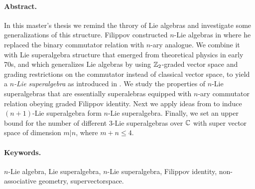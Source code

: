 \paragraph{Abstract.}
    In this master’s thesis we remind the throry of Lie algebras and
    investigate some generalizations of this structure. Filippov constructed
    $n$-Lie algebras in \cite{filippov1985} where he replaced the binary
    commutator relation with $n$-ary analogue. We combine it with
    Lie superalgebra structure that emerged from theoretical
    physics in early 70s, and which generalizes Lie algebras by using
    $\mathbb{Z}_2$-graded vector space and grading restrictions on the commutator
    instead of classical vector space, to yield a \emph{$n$-Lie superalgebra}
    as introduced in \cite{Abramov:2014}.
    We study the properties of $n$-Lie superalgebras that are essentially
    superalebras equipped with $n$-ary commutator relation obeying graded
    Filippov identity. Next we apply ideas from
    \cite{Abramov:2014,AKMS:2014} to induce $(n+1)$-Lie superalgebra form
    $n$-Lie superalgebra. Finally, we set an upper bound for the number of
    different $3$-Lie superalgebras over $\mathbb{C}$ with super vector space of
    dimension $m|n$, where $m+n \leq 4$.
\paragraph{Keywords.}
    $n$-Lie algebra, Lie superalgebra, $n$-Lie superalgebra,
    Filippov identity, non-associative geometry, supervectorspace.